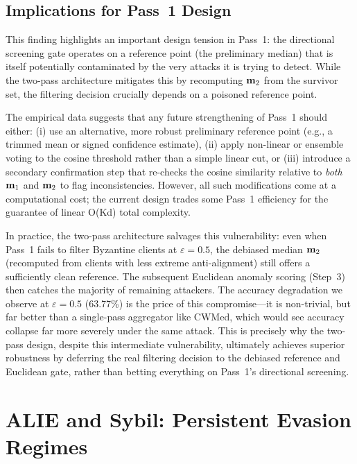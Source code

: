\documentclass[../main.tex]{subfiles}
\begin{document}
\subsection{Implications for Pass~1 Design}
\label{sec:pass1_limitations}

This finding highlights an important design tension in Pass~1: the directional screening gate operates on a reference point (the preliminary median) that is itself potentially contaminated by the very attacks it is trying to detect. While the two-pass architecture mitigates this by recomputing $\mathbf{m}_{2}$ from the survivor set, the filtering decision crucially depends on a poisoned reference point.

The empirical data suggests that any future strengthening of Pass~1 should either: (i) use an alternative, more robust preliminary reference point (e.g., a trimmed mean or signed confidence estimate), (ii) apply non-linear or ensemble voting to the cosine threshold rather than a simple linear cut, or (iii) introduce a secondary confirmation step that re-checks the cosine similarity relative to \emph{both} $\mathbf{m}_{1}$ and $\mathbf{m}_{2}$ to flag inconsistencies. However, all such modifications come at a computational cost; the current design trades some Pass~1 efficiency for the guarantee of linear O(Kd) total complexity.

In practice, the two-pass architecture salvages this vulnerability: even when Pass~1 fails to filter Byzantine clients at $\varepsilon=0.5$, the debiased median $\mathbf{m}_{2}$ (recomputed from clients with less extreme anti-alignment) still offers a sufficiently clean reference. The subsequent Euclidean anomaly scoring (Step~3) then catches the majority of remaining attackers. The accuracy degradation we observe at $\varepsilon=0.5$ (63.77\%) is the price of this compromise---it is non-trivial, but far better than a single-pass aggregator like CWMed, which would see accuracy collapse far more severely under the same attack. This is precisely why the two-pass design, despite this intermediate vulnerability, ultimately achieves superior robustness by deferring the real filtering decision to the debiased reference and Euclidean gate, rather than betting everything on Pass~1's directional screening.

\section{ALIE and Sybil: Persistent Evasion Regimes}
\label{sec:results_alie_sybil}
\end{document}
